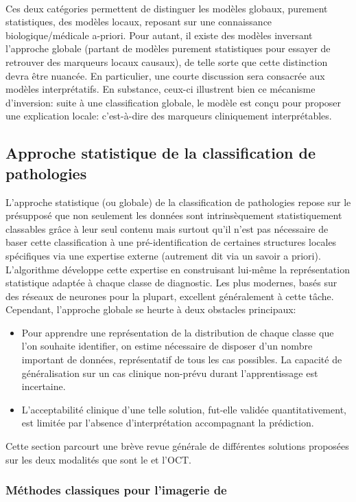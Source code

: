 \\
Ces deux catégories permettent de distinguer les modèles globaux, purement statistiques, des modèles locaux, reposant sur une connaissance biologique/médicale a-priori. Pour autant, il existe des modèles inversant l'approche globale (partant de modèles purement statistiques pour essayer de retrouver des marqueurs locaux causaux), de telle sorte que cette distinction devra être nuancée. En particulier, une courte discussion sera consacrée aux modèles interprétatifs. En substance, ceux-ci illustrent bien ce mécanisme d'inversion: suite à une classification globale, le modèle est conçu pour proposer une explication locale: c'est-à-dire des marqueurs cliniquement interprétables.


\subsection{Approche statistique de la classification de pathologies}
L'approche statistique (ou globale) de la classification de pathologies repose sur le présupposé que non seulement les données sont intrinsèquement statistiquement classables grâce à leur seul contenu mais surtout qu'il n'est pas nécessaire de baser cette classification à une pré-identification de certaines structures locales spécifiques via une expertise externe (autrement dit via un savoir a priori). L'algorithme développe cette expertise en construisant lui-même la représentation statistique adaptée à chaque classe de diagnostic. Les plus modernes, basés sur des réseaux de neurones pour la plupart, excellent généralement à cette tâche. Cependant, l'approche globale se heurte à deux obstacles principaux:
\begin{itemize}
	\item Pour apprendre une représentation de la distribution de chaque classe que l'on souhaite identifier, on estime nécessaire de disposer d'un nombre important de données, représentatif de tous les cas possibles. La capacité de généralisation sur un cas clinique non-prévu durant l'apprentissage est incertaine.
	\item L'acceptabilité clinique d'une telle solution, fut-elle validée  quantitativement, est limitée par l'absence d'interprétation accompagnant la prédiction.
\end{itemize}
Cette section parcourt une brève revue générale de différentes solutions proposées sur les deux modalités que sont le \fundus{} et l'\ac{OCT}.

\subsubsection{Méthodes classiques pour l'imagerie de \fundus{}}


